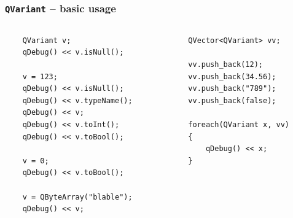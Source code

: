 \begin{frame}[fragile]
  \frametitle{\texttt{QVariant} -- basic usage}
  \small
  \begin{columns}
    \begin{column}{0.47\textwidth}
    \begin{lstlisting}
	QVariant v;
	qDebug() << v.isNull();

	v = 123;
	qDebug() << v.isNull();
	qDebug() << v.typeName();
	qDebug() << v;
	qDebug() << v.toInt();
	qDebug() << v.toBool();

	v = 0;
	qDebug() << v.toBool();

	v = QByteArray("blable");
	qDebug() << v;
    \end{lstlisting}
    \end{column}
    \begin{column}{0.53\textwidth}
    \begin{lstlisting}
	QVector<QVariant> vv;

	vv.push_back(12);
	vv.push_back(34.56);
	vv.push_back("789");
	vv.push_back(false);

	foreach(QVariant x, vv)
	{
	    qDebug() << x;
	}
    \end{lstlisting}
    \end{column}
  \end{columns}
\end{frame}

